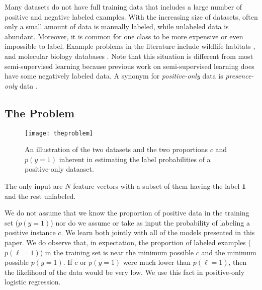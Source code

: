 \documentclass{article}
\begin{document}
Many datasets do not have full training data that includes a large number of positive and negative labeled examples.  With the increasing size of datasets, often only a small amount of data is manually labeled, while unlabeled data is abundant. Moreover, it is common for one class to be more expensive or even impossible to label.  Example problems in the literature include wildlife habitats \cite{ward08}, and molecular biology databases \cite{elkan08}.  Note that this situation is different from most semi-supervised learning because previous work on semi-supervised learning does have some negatively labeled data.  A synonym for \emph{positive-only} data is \emph{presence-only} data \cite{ward08}.

\subsection{The Problem}

\begin{figure}[ht!]
\vskip 0.2in
\begin{center}
\centerline{\texttt{[image: theproblem]}}
\caption{An illustration of the two datasets and the two proportions $c$ and $p(y=1)$ inherent in estimating the label probabilities of a positive-only dataaset. }
\label{changingodds}
\end{center}
\vskip -0.2in
\end{figure}

The only input are $N$ feature vectors with a subset of them having the label $\mathbf{1}$ and the rest unlabeled.  

We do not assume that we know the proportion of positive data in the training set ($p(y=1)$) nor do we assume or take as input the probability of labeling a positive instance $c$.  We learn both jointly with all of the models presented in this paper.  We do observe that, in expectation, the proportion of labeled examples ($p(\ell=1)$) in the training set is near the minimum possible $c$ and the minimum possible $p(y=1)$. If $c$ or $p(y=1)$ were much lower than $p(\ell=1)$, then the likelihood of the data would be very low.  We use this fact in positive-only logistic regression.
\end{document}
